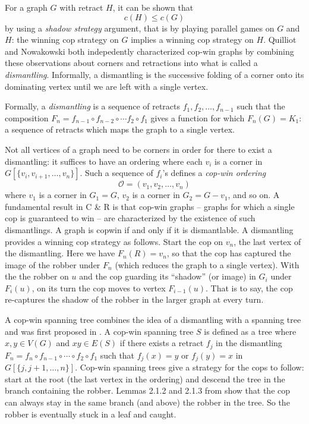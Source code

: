 For a graph $G$ with retract $H$, it can be shown \cite{berarducci1993cop} that
\[ c(H) \leq c(G) \]
by using a \textit{shadow strategy} argument, that is by playing parallel games on $G$ and $H$: the winning cop strategy on $G$ implies a winning cop strategy on $H$. Quilliot and Nowakowski both indepedently characterized cop-win graphs by combining these observations about corners and retractions into what is called a \textit{dismantling}. Informally, a dismantling is the successive folding of a corner onto its dominating vertex until we are left with a single vertex.

Formally, a \textit{dismantling} is a sequence of retracts $f_1, f_2, \dots, f_{n-1}$ such that the
composition $F_{n} = f_{n-1} \circ f_{n-2} \circ \cdots f_2 \circ f_1$ gives a
function for which $F_{n} (G) = K_1$: a sequence of retracts
which maps the graph to a single vertex.

Not all vertices of a graph need to be corners in order for there
to exist a dismantling: it suffices to have an ordering where each $v_i$ is a corner in
$G[\{v_i, v_{i+1}, \dots, v_n\}]$. Such a sequence of $f_i$'s defines a \textit{cop-win ordering}
\[ \mathcal{O} = ( v_1, v_2, \dots, v_n ) \]
where $v_1$ is a corner in $G_1 = G$, $v_2$ is a corner in $G_2 = G - v_1$, and so on. A fundamental result in C \& R is that cop-win graphs -- graphs for which a single
cop is guaranteed to win --  are characterized by the existence of such dismantlings.
A graph is copwin if and only if it is dismantlable. A dismantling provides a winning cop strategy as follows. Start the cop on $v_n$, the last vertex of the dismantling. Here we have $F_n(R) = v_n$, so that the cop has captured the image of the robber under $F_n$ (which reduces the graph to a single vertex). With the the robber on $u$ and the cop guarding its ``shadow'' (or image) in $G_i$ under $F_i(u)$, on its turn the cop moves to vertex $F_{i-1}(u)$. That is to say, the cop re-captures the shadow of the robber in the larger graph at every turn.

A cop-win spanning tree combines the idea of a dismantling with a spanning tree
and was first proposed in \cite{clarke2002constrained}. A cop-win spanning tree $S$ is defined as a tree where $x,y\in V(G)$ and $xy \in E(S)$ if there exists a retract $f_j$ in the dismantling
$F_n = f_{n} \circ f_{n-1} \circ \cdots \circ f_{2} \circ f_1$ such that $f_j (x) = y$ or $f_j (y) = x$ in $G[\{j, j+1, \dots, n \}]$. Cop-win spanning trees give a strategy for the cops to follow: start at the root
(the last vertex in the ordering) and descend the tree in the branch containing the robber.
Lemmas 2.1.2 and 2.1.3 from \cite{clarke2002constrained} show that the cop
can always stay in the same branch (and above) the robber in the tree. So the
robber is eventually stuck in a leaf and caught.

